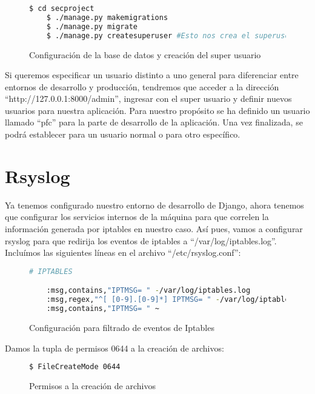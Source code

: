 \begin{figure}[H]
  \begin{lstlisting}[language=bash]
    $ cd secproject
    $ ./manage.py makemigrations
    $ ./manage.py migrate
    $ ./manage.py createsuperuser #Esto nos crea el superuser de administracion
  \end{lstlisting}
  \caption{Configuración de la base de datos y creación del super usuario}
\end{figure}

Si queremos especificar un usuario distinto a uno general para diferenciar entre entornos de desarrollo y producción, tendremos que acceder a la dirección ``http://127.0.0.1:8000/admin'', ingresar con el super usuario y definir nuevos usuarios para nuestra aplicación. Para nuestro propósito se ha definido un usuario llamado ``pfc'' para la parte de desarrollo de la aplicación. Una vez finalizada, se podrá establecer para un usuario normal o para otro específico.\\

\section{Rsyslog}

Ya tenemos configurado nuestro entorno de desarrollo de Django, ahora tenemos que configurar los servicios internos de la máquina para que correlen la información generada por iptables en nuestro caso. Así pues, vamos a configurar rsyslog para que redirija los eventos de iptables a ``/var/log/iptables.log''.\\

Incluímos las siguientes líneas en el archivo ``/etc/rsyslog.conf'':

\begin{figure}[H]
  \begin{lstlisting}[language=bash]
    # IPTABLES

    :msg,contains,"IPTMSG= " -/var/log/iptables.log
    :msg,regex,"^[ [0-9].[0-9]*] IPTMSG= " -/var/log/iptables.log
    :msg,contains,"IPTMSG= " ~
  \end{lstlisting}
  \caption{Configuración para filtrado de eventos de Iptables}
\end{figure}

Damos la tupla de permisos 0644 a la creación de archivos:

\begin{figure}[H]
  \begin{lstlisting}[language=bash]
   $ FileCreateMode 0644
  \end{lstlisting}
  \caption{Permisos a la creación de archivos}
\end{figure}

